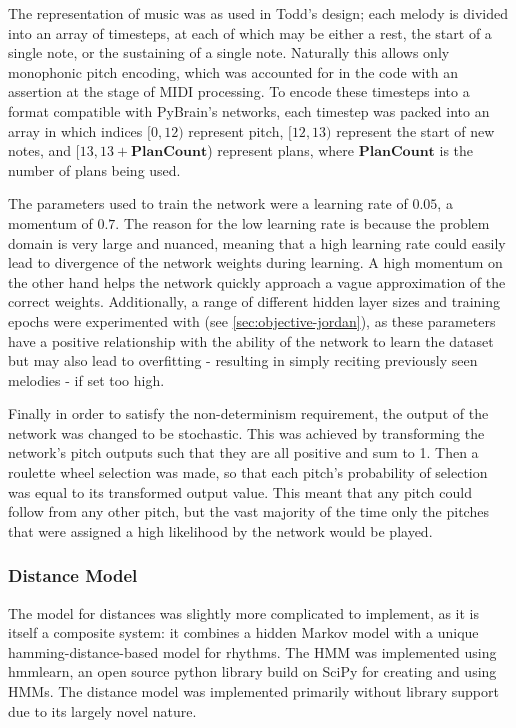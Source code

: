 \documentclass[ author={Stephen Livermore-Tozer},
				supervisor={Dr. Peter Flach},
				degree={MEng},
				title={Algorithmic Co-composition Using Machine Learning},
				subtitle={},
				type={research},
				year={2016} ]{dissertation}
\begin{document}
	The representation of music was as used in Todd's design; each melody is divided into an array of timesteps, at each of which may be either a rest, the start of a single note, or the sustaining of a single note. Naturally this allows only monophonic pitch encoding, which was accounted for in the code with an assertion at the stage of MIDI processing. To encode these timesteps into a format compatible with PyBrain's networks, each timestep was packed into an array in which indices $[0,12)$ represent pitch, $[12,13)$ represent the start of new notes, and $[13,13+\mathbf{PlanCount}$) represent plans, where $\mathbf{PlanCount}$ is the number of plans being used.
	
	The parameters used to train the network were a learning rate of $0.05$, a momentum of $0.7$. The reason for the low learning rate is because the problem domain is very large and nuanced, meaning that a high learning rate could easily lead to divergence of the network weights during learning. A high momentum on the other hand helps the network quickly approach a vague approximation of the correct weights. Additionally, a range of different hidden layer sizes and training epochs were experimented with (see \ref{sec:objective-jordan}), as these parameters have a positive relationship with the ability of the network to learn the dataset but may also lead to overfitting - resulting in simply reciting previously seen melodies - if set too high.
	
	Finally in order to satisfy the non-determinism requirement, the output of the network was changed to be stochastic. This was achieved by transforming the network's pitch outputs such that they are all positive and sum to 1. Then a roulette wheel selection was made, so that each pitch's probability of selection was equal to its transformed output value. This meant that any pitch could follow from any other pitch, but the vast majority of the time only the pitches that were assigned a high likelihood by the network would be played. 
	
	\subsubsection{Distance Model}
	
	The model for distances was slightly more complicated to implement, as it is itself a composite system: it combines a hidden Markov model with a unique hamming-distance-based model for rhythms. The HMM was implemented using hmmlearn, an open source python library build on SciPy for creating and using HMMs. The distance model was implemented primarily without library support due to its largely novel nature. 
	
\end{document}
